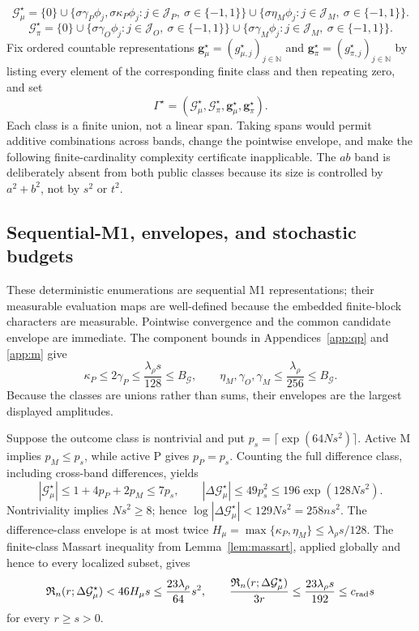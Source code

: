 \[
\mathcal G_\mu^\star
=\{0\}
\cup\{\sigma\gamma_P\phi_j,\sigma\kappa_P\phi_j:
          j\in\mathcal J_P,\ \sigma\in\{-1,1\}\}
\cup\{\sigma\eta_M\phi_j:
          j\in\mathcal J_M,\ \sigma\in\{-1,1\}\}.
\]
\[
\mathcal G_\pi^\star
=\{0\}
\cup\{\sigma\gamma_O\phi_j:
          j\in\mathcal J_O,\ \sigma\in\{-1,1\}\}
\cup\{\sigma\gamma_M\phi_j:
          j\in\mathcal J_M,\ \sigma\in\{-1,1\}\}.
\]
Fix ordered countable representations
\(\mathbf g_\mu^\star=(g_{\mu,j}^\star)_{j\in\mathbb N}\) and
\(\mathbf g_\pi^\star=(g_{\pi,j}^\star)_{j\in\mathbb N}\) by listing every
element of the corresponding finite class and then repeating zero, and set
\[
 \Gamma^\star=(\mathcal G_\mu^\star,\mathcal G_\pi^\star,
                 \mathbf g_\mu^\star,\mathbf g_\pi^\star).
\]
Each class is a finite union, not a linear span.  Taking spans would permit
additive combinations across bands, change the pointwise envelope, and make
the following finite-cardinality complexity certificate inapplicable.
The \(ab\) band is deliberately absent from both public classes because its
size is controlled by \(a^2+b^2\), not by \(s^2\) or \(t^2\).

\subsection{Sequential-M1, envelopes, and stochastic budgets}

These deterministic enumerations are sequential M1 representations; their
measurable evaluation maps are well-defined because the embedded finite-block
characters are measurable.  Pointwise convergence and the common candidate
envelope are immediate.  The component bounds in Appendices~\ref{app:qp} and
\ref{app:m} give
\[
 \kappa_P\le2\gamma_P\le\frac{\lambda_\rho s}{128}\le B_{\mathcal G},
 \qquad
 \eta_M,\gamma_O,\gamma_M\le\frac{\lambda_\rho}{256}\le B_{\mathcal G}.
\]
Because the classes are unions rather than sums, their envelopes are the
largest displayed amplitudes.

Suppose the outcome class is nontrivial and put
\(p_s=\lceil\exp(64Ns^2)\rceil\).  Active M implies \(p_M\le p_s\), while
active P gives \(p_P=p_s\).  Counting the full difference class, including
cross-band differences, yields
\[
 |\mathcal G_\mu^\star|\le1+4p_P+2p_M\le7p_s,\qquad
 |\Delta\mathcal G_\mu^\star|\le49p_s^2
 \le196\exp(128Ns^2).
\]
Nontriviality implies \(Ns^2\ge8\); hence
\(\log|\Delta\mathcal G_\mu^\star|<129Ns^2=258ns^2\).
The difference-class envelope is at most twice
\(H_\mu=\max\{\kappa_P,\eta_M\}\le\lambda_\rho s/128\).
The finite-class Massart inequality from Lemma~\ref{lem:massart}, applied
globally and hence to every localized subset, gives
\[
 \mathfrak R_n(r;\Delta\mathcal G_\mu^\star)
 <46H_\mu s\le\frac{23\lambda_\rho}{64}s^2,
 \qquad
 \frac{\mathfrak R_n(r;\Delta\mathcal G_\mu^\star)}{3r}
 \le\frac{23\lambda_\rho s}{192}\le c_{\rm rad}s
\]
for every \(r\ge s>0\).

